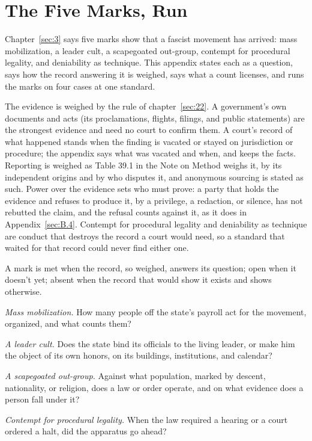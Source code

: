 \chapter{The Five Marks, Run}
\label{sec:H}

Chapter~\ref{sec:3} says five marks show that a fascist movement has arrived: mass mobilization, a leader cult, a scapegoated out-group, contempt for procedural legality, and deniability as technique. This appendix states each as a question, says how the record answering it is weighed, says what a count licenses, and runs the marks on four cases at one standard.


The evidence is weighed by the rule of chapter~\ref{sec:22}. A government's own documents and acts (its proclamations, flights, filings, and public statements) are the strongest evidence and need no court to confirm them. A court's record of what happened stands when the finding is vacated or stayed on jurisdiction or procedure; the appendix says what was vacated and when, and keeps the facts. Reporting is weighed as Table 39.1 in the Note on Method weighs it, by its independent origins and by who disputes it, and anonymous sourcing is stated as such. Power over the evidence sets who must prove: a party that holds the evidence and refuses to produce it, by a privilege, a redaction, or silence, has not rebutted the claim, and the refusal counts against it, as it does in Appendix~\ref{sec:B.4}. Contempt for procedural legality and deniability as technique are conduct that destroys the record a court would need, so a standard that waited for that record could never find either one.

A mark is met when the record, so weighed, answers its question; open when it doesn't yet; absent when the record that would show it exists and shows otherwise.

\emph{Mass mobilization.} How many people off the state's payroll act for the movement, organized, and what counts them?

\emph{A leader cult.} Does the state bind its officials to the living leader, or make him the object of its own honors, on its buildings, institutions, and calendar?

\emph{A scapegoated out-group.} Against what population, marked by descent, nationality, or religion, does a law or order operate, and on what evidence does a person fall under it?

\emph{Contempt for procedural legality.} When the law required a hearing or a court ordered a halt, did the apparatus go ahead?

